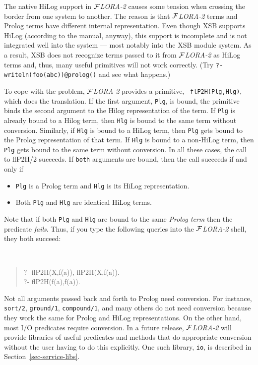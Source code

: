 \documentclass[11pt]{article}
\newcommand{\FLORA}{{\mbox{${\cal F}${\small\it LORA}\rm\emph{-2}}}\xspace}
\begin{document}
The native HiLog support in \FLORA causes some tension when crossing the
border from one system to another. The reason is that \FLORA terms and Prolog
terms have different internal representation. Even though XSB supports
HiLog (according to the manual, anyway), this support is incomplete and is
not integrated well into the system --- most notably into the XSB module
system. As a result, XSB does not recognize terms passed to it from \FLORA
as HiLog terms and, thus, many useful primitives will not work correctly.
(Try {\tt ?- writeln(foo(abc))@prolog()} and see what happens.)

To cope with the problem, \FLORA provides a primitive, {\tt
  flP2H(Plg,Hlg)}, which does the translation. If the first argument,
{\tt Plg}, is bound, the primitive binds the second argument to the
Hilog representation of the term. If {\tt Plg} is already bound to a
Hilog term, then {\tt Hlg} is bound to the same term without conversion.
Similarly, if {\tt Hlg} is bound to a HiLog term, then {\tt Plg} gets
bound to the Prolog representation of that term. If {\tt Hlg} is bound to
a non-HiLog term, then {\tt Plg} gets bound to the same term without
conversion. In all these cases, the call to flP2H/2 succeeds. If {\tt both}
arguments are bound, then the call succeeds if and only if
\begin{itemize}
\item {\tt Plg} is a Prolog term and {\tt Hlg} is its HiLog
  representation.
\item Both {\tt Plg} and {\tt Hlg} are identical HiLog terms.
\end{itemize}
Note that if both {\tt Plg} and {\tt Hlg} are bound to the same
\emph{Prolog term} then the predicate \emph{fails}. Thus, if you type the
following queries into the \FLORA shell, they both succeed:
{\tt
\begin{quote}
  ?- flP2H(X,f(a)), flP2H(X,f(a)).  \\
  ?- flP2H(f(a),f(a)).
\end{quote}
}


Not all arguments passed back and forth to Prolog need conversion. For
instance, {\tt sort/2}, {\tt ground/1}, {\tt compound/1}, and many others
do not need conversion because they work the same for Prolog and HiLog
representations. On the other hand, most I/O predicates require conversion.
In a future release, \FLORA will provide libraries of useful predicates and
methods that do appropriate conversion without the user having to do
this explicitly. One such library, {\tt io}, is described in
Section~\ref{sec-service-libs}.
\end{document}
